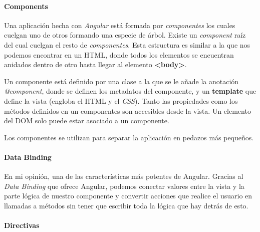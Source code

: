 
\paragraph{Components}

Una aplicación hecha con \emph{Angular} está formada por \emph{componentes} los cuales cuelgan uno de otros formando una especie de árbol. Existe un  \emph{component} raíz del cual cuelgan el resto de  \emph{componentes}. Esta estructura es similar a la que nos podemos encontrar en un \gls{HTML}, donde todos los elementos se encuentran anidados dentro de otro hasta llegar al elemento \textbf{<body>}.

Un componente está definido por una clase a la que se le añade la anotación \emph{@component}, donde se definen los metadatos del componente, y un \textbf{template} que define la vista (engloba el \gls{HTML} y el \emph{CSS}). Tanto las propiedades como los métodos definidos en un componentes son accesibles desde la vista. Un elemento del \gls{DOM} solo puede estar asociado a un componente.

Los componentes se utilizan para separar la aplicación en pedazos más pequeños.

\paragraph{Data Binding}

En mi opinión, una de las características más potentes de Angular. Gracias al \emph{Data Binding} que ofrece Angular, podemos conectar valores entre la vista y la parte lógica de nuestro componente y convertir acciones que realice el usuario en llamadas a métodos sin tener que escribir toda la lógica que hay detrás de esto.

\paragraph{Directivas}

